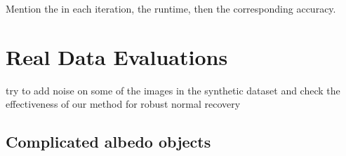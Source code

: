 Mention the in each iteration, the runtime, then the corresponding accuracy. 



\section{Real Data Evaluations}

try to add noise on some of the images in the synthetic dataset and check the effectiveness of our method for robust normal recovery
\subsection{Complicated albedo objects}

